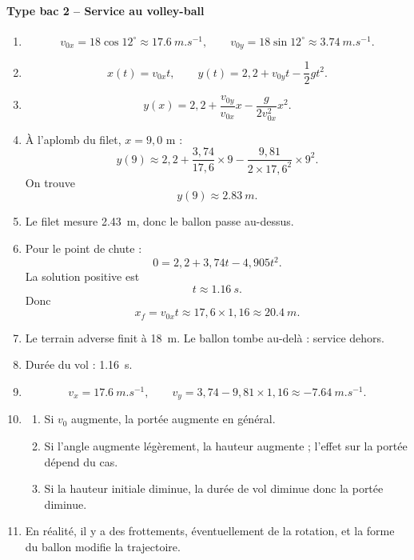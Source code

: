 \documentclass[11pt,a4paper]{article}
\theoremstyle{definition}
\begin{document}
\paragraph{Type bac 2 -- Service au volley-ball}
\begin{enumerate}[label=\arabic*.]
    \item
    \[
    v_{0x}=18\cos 12^\circ \approx \SI{17,6}{m.s^{-1}},
    \qquad
    v_{0y}=18\sin 12^\circ \approx \SI{3,74}{m.s^{-1}}.
    \]
    \item
    \[
    x(t)=v_{0x}t,\qquad y(t)=2,2+v_{0y}t-\frac12 gt^2.
    \]
    \item
    \[
    y(x)=2,2+\frac{v_{0y}}{v_{0x}}x-\frac{g}{2v_{0x}^2}x^2.
    \]
    \item À l’aplomb du filet, $x=9,0$ m :
    \[
    y(9)\approx 2,2+\frac{3,74}{17,6}\times 9-\frac{9,81}{2\times 17,6^2}\times 9^2.
    \]
    On trouve
    \[
    y(9)\approx \SI{2,83}{m}.
    \]
    \item Le filet mesure \SI{2,43}{m}, donc le ballon passe au-dessus.
    \item Pour le point de chute :
    \[
    0=2,2+3,74t-4,905t^2.
    \]
    La solution positive est
    \[
    t \approx \SI{1,16}{s}.
    \]
    Donc
    \[
    x_f=v_{0x}t \approx 17,6\times 1,16 \approx \SI{20,4}{m}.
    \]
    \item Le terrain adverse finit à \SI{18}{m}. Le ballon tombe au-delà : service dehors.
    \item Durée du vol : \SI{1,16}{s}.
    \item
    \[
    v_x=\SI{17,6}{m.s^{-1}},\qquad
    v_y=3,74-9,81\times1,16\approx \SI{-7,64}{m.s^{-1}}.
    \]
    \item
    \begin{enumerate}[label=\alph*)]
        \item Si $v_0$ augmente, la portée augmente en général.
        \item Si l’angle augmente légèrement, la hauteur augmente ; l’effet sur la portée dépend du cas.
        \item Si la hauteur initiale diminue, la durée de vol diminue donc la portée diminue.
    \end{enumerate}
    \item En réalité, il y a des frottements, éventuellement de la rotation, et la forme du ballon modifie la trajectoire.
\end{enumerate}
\end{document}
